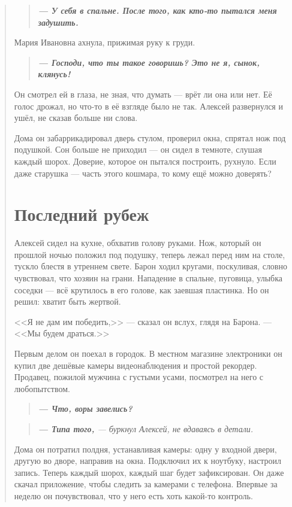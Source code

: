\documentclass[12pt,a4paper]{book}
\newenvironment{dialogue}{\begin{quote}\itshape}{\end{quote}} %
\begin{document}
\begin{dialogue}
\begin{dialogue}
\textbf{--- У себя в спальне. После того, как кто-то пытался меня задушить.}
\end{dialogue}

Мария Ивановна ахнула, прижимая руку к груди.

\begin{dialogue}
\textbf{--- Господи, что ты такое говоришь? Это не я, сынок, клянусь!}
\end{dialogue}

Он смотрел ей в глаза, не зная, что думать --- врёт ли она или нет. Её голос дрожал, но что-то в её взгляде было не так. Алексей развернулся и ушёл, не сказав больше ни слова.

Дома он забаррикадировал дверь стулом, проверил окна, спрятал нож под подушкой. Сон больше не приходил --- он сидел в темноте, слушая каждый шорох. Доверие, которое он пытался построить, рухнуло. Если даже старушка --- часть этого кошмара, то кому ещё можно доверять?

\chapter{Последний рубеж}

Алексей сидел на кухне, обхватив голову руками. Нож, который он прошлой ночью положил под подушку, теперь лежал перед ним на столе, тускло блестя в утреннем свете. Барон ходил кругами, поскуливая, словно чувствовал, что хозяин на грани. Нападение в спальне, пуговица, улыбка соседки --- всё крутилось в его голове, как заевшая пластинка. Но он решил: хватит быть жертвой.

<<Я не дам им победить,>> --- сказал он вслух, глядя на Барона. --- <<Мы будем драться.>>

Первым делом он поехал в городок. В местном магазине электроники он купил две дешёвые камеры видеонаблюдения и простой рекордер. Продавец, пожилой мужчина с густыми усами, посмотрел на него с любопытством.

\begin{dialogue}
\textbf{--- Что, воры завелись?}
\end{dialogue}

\begin{dialogue}
\textbf{--- Типа того,} --- буркнул Алексей, не вдаваясь в детали.
\end{dialogue}

Дома он потратил полдня, устанавливая камеры: одну у входной двери, другую во дворе, направив на окна. Подключил их к ноутбуку, настроил запись. Теперь каждый шорох, каждый шаг будет зафиксирован. Он даже скачал приложение, чтобы следить за камерами с телефона. Впервые за неделю он почувствовал, что у него есть хоть какой-то контроль.


\end{dialogue}
\end{document}
